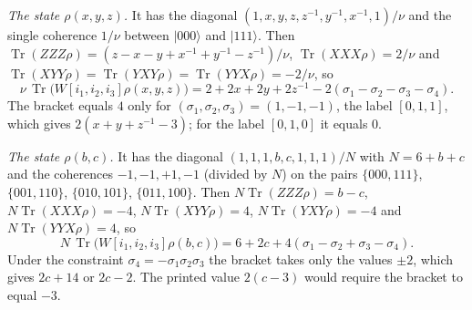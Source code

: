 \documentclass[11pt,a4paper]{article}
\theoremstyle{remark}
\newcommand{\ket}[1]{\lvert #1\rangle}
\newcommand{\tr}{\operatorname{Tr}}
\begin{document}
\emph{The state $\rho(x,y,z)$.} It has the diagonal
$(1,x,y,z,z^{-1},y^{-1},x^{-1},1)/\nu$ and the single coherence $1/\nu$ between
$\ket{000}$ and $\ket{111}$. Then $\tr(ZZZ\rho)=(z-x-y+x^{-1}+y^{-1}-z^{-1})/\nu$,
$\tr(XXX\rho)=2/\nu$ and $\tr(XYY\rho)=\tr(YXY\rho)=\tr(YYX\rho)=-2/\nu$, so
\begin{equation*}
\nu\,\tr\bigl(W[i_1,i_2,i_3]\rho(x,y,z)\bigr)=2+2x+2y+2z^{-1}-2(\sigma_1-\sigma_2-\sigma_3-\sigma_4).
\end{equation*}
The bracket equals $4$ only for $(\sigma_1,\sigma_2,\sigma_3)=(1,-1,-1)$, the label
$[0,1,1]$, which gives $2(x+y+z^{-1}-3)$; for the label $[0,1,0]$ it equals $0$.

\emph{The state $\rho(b,c)$.} It has the diagonal $(1,1,1,b,c,1,1,1)/N$ with $N=6+b+c$
and the coherences $-1,-1,+1,-1$ (divided by $N$) on the pairs
$\{000,111\}$, $\{001,110\}$, $\{010,101\}$, $\{011,100\}$. Then $N\tr(ZZZ\rho)=b-c$,
$N\tr(XXX\rho)=-4$, $N\tr(XYY\rho)=4$, $N\tr(YXY\rho)=-4$ and $N\tr(YYX\rho)=4$, so
\begin{equation*}
N\,\tr\bigl(W[i_1,i_2,i_3]\rho(b,c)\bigr)=6+2c+4(\sigma_1-\sigma_2+\sigma_3-\sigma_4).
\end{equation*}
Under the constraint $\sigma_4=-\sigma_1\sigma_2\sigma_3$ the bracket takes only the
values $\pm2$, which gives $2c+14$ or $2c-2$. The printed value $2(c-3)$ would require
the bracket to equal $-3$.
\end{document}
